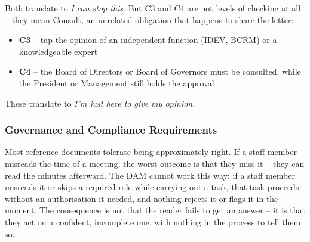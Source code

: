 Both translate to \textit{I can stop this}. But C3 and C4 are not levels
of checking at all -- they mean Consult, an unrelated obligation that
happens to share the letter:

\begin{itemize}
\item \textbf{C3} -- tap the opinion of an independent function (IDEV,
  BCRM) or a knowledgeable expert
\item \textbf{C4} -- the Board of Directors or Board of Governors must be
  consulted, while the President or Management still holds the approval
\end{itemize}

These translate to \textit{I'm just here to give my opinion}.


\subsubsection{Governance and Compliance Requirements}


Most reference documents tolerate being approximately right. If a staff
member misreads the time of a meeting, the worst outcome is that they
miss it -- they can read the minutes afterward. The DAM cannot work this
way: if a staff member misreads it or skips a required role while
carrying out a task, that task proceeds without an authorisation it
needed, and nothing rejects it or flags it in the moment. The consequence
is not that the reader fails to get an answer -- it is that they act on
a confident, incomplete one, with nothing in the process to tell them so.

